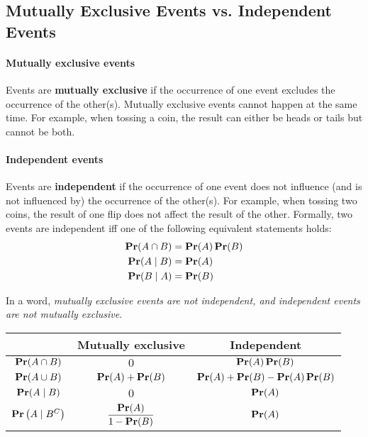 \subsection{Mutually Exclusive Events vs. Independent Events}

\paragraph{Mutually exclusive events}
Events are \textbf{mutually exclusive} if the occurrence of one event excludes the occurrence of the other(s). Mutually exclusive events cannot happen at the same time. For example, when tossing a coin, the result can either be heads or tails but cannot be both.

\paragraph{Independent events}
Events are \textbf{independent} if the occurrence of one event does not influence (and is not influenced by) the occurrence of the other(s). For example, when tossing two coins, the result of one flip does not affect the result of the other. Formally, two events are independent iff one of the following equivalent statements holds:
\begin{align*}
    \mathop{\mathbf{Pr}}(A \cap B) &= \mathop{\mathbf{Pr}}(A) \mathop{\mathbf{Pr}}(B) \\
    \mathop{\mathbf{Pr}}(A \mid B) &= \mathop{\mathbf{Pr}}(A) \\
    \mathop{\mathbf{Pr}}(B \mid A) &= \mathop{\mathbf{Pr}}(B) \\
\end{align*}

In a word, \textit{mutually exclusive events are not independent, and independent events are not mutually exclusive}.

\begin{table}[ht!]
    \centering
    \begin{tabular}{ccc}
        \toprule
        & Mutually exclusive & Independent \\
        \midrule
        $\mathop{\mathbf{Pr}}(A \cap B)$ & $0$ & $\mathop{\mathbf{Pr}}(A) \mathop{\mathbf{Pr}}(B)$ \\
        $\mathop{\mathbf{Pr}}(A \cup B)$ & $\mathop{\mathbf{Pr}}(A) + \mathop{\mathbf{Pr}}(B)$ & $\mathop{\mathbf{Pr}}(A)+\mathop{\mathbf{Pr}}(B)-\mathop{\mathbf{Pr}}(A)\mathop{\mathbf{Pr}}(B)$ \\
        $\mathop{\mathbf{Pr}}(A \mid B)$ & $0$ & $\mathop{\mathbf{Pr}}(A)$ \\
        $\mathop{\mathbf{Pr}}\left(A \mid B^C\right)$ & $\dfrac{\mathop{\mathbf{Pr}}(A)}{1-\mathop{\mathbf{Pr}}(B)}$ & $\mathop{\mathbf{Pr}}(A)$ \\
        \bottomrule
    \end{tabular}
\end{table}
